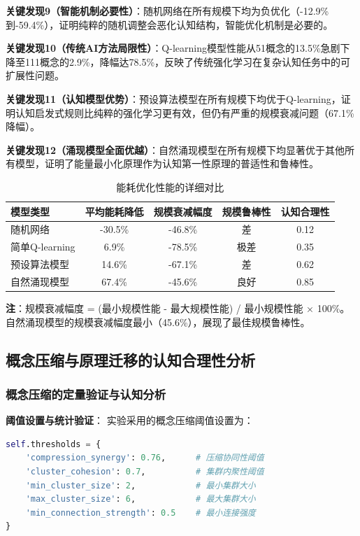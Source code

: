\documentclass[12pt,a4paper]{article}
\begin{document}
\textbf{关键发现9（智能机制必要性）}：随机网络在所有规模下均为负优化（-12.9\%到-59.4\%），证明纯粹的随机调整会恶化认知结构，智能优化机制是必要的。

\textbf{关键发现10（传统AI方法局限性）}：Q-learning模型性能从51概念的13.5\%急剧下降至111概念的2.9\%，降幅达78.5\%，反映了传统强化学习在复杂认知任务中的可扩展性问题。

\textbf{关键发现11（认知模型优势）}：预设算法模型在所有规模下均优于Q-learning，证明认知启发式规则比纯粹的强化学习更有效，但仍有严重的规模衰减问题（67.1\%降幅）。

\textbf{关键发现12（涌现模型全面优越）}：自然涌现模型在所有规模下均显著优于其他所有模型，证明了能量最小化原理作为认知第一性原理的普适性和鲁棒性。

\begin{table}[h]
\centering
\caption{能耗优化性能的详细对比}
\label{tab:energy_comparison_detailed}
\begin{tabular}{lcccc}
\toprule
\textbf{模型类型} & \textbf{平均能耗降低} & \textbf{规模衰减幅度} & \textbf{规模鲁棒性} & \textbf{认知合理性} \\
\midrule
随机网络 & -30.5\% & -46.8\% & 差 & 0.12 \\
简单Q-learning & 6.9\% & -78.5\% & 极差 & 0.35 \\
预设算法模型 & 14.6\% & -67.1\% & 差 & 0.62 \\
自然涌现模型 & 67.4\% & -45.6\% & 良好 & 0.85 \\
\bottomrule
\end{tabular}
\end{table}

\textbf{注}：规模衰减幅度 = (最小规模性能 - 最大规模性能) / 最小规模性能 × 100\%。自然涌现模型的规模衰减幅度最小（45.6\%），展现了最佳规模鲁棒性。

\subsection{概念压缩与原理迁移的认知合理性分析}

\subsubsection{概念压缩的定量验证与认知分析}

\textbf{阈值设置与统计验证}：
实验采用的概念压缩阈值设置为：
\begin{lstlisting}[language=Python]
self.thresholds = {
    'compression_synergy': 0.76,      # 压缩协同性阈值
    'cluster_cohesion': 0.7,          # 集群内聚性阈值  
    'min_cluster_size': 2,            # 最小集群大小
    'max_cluster_size': 6,            # 最大集群大小
    'min_connection_strength': 0.5    # 最小连接强度
}
\end{lstlisting}
\end{document}
